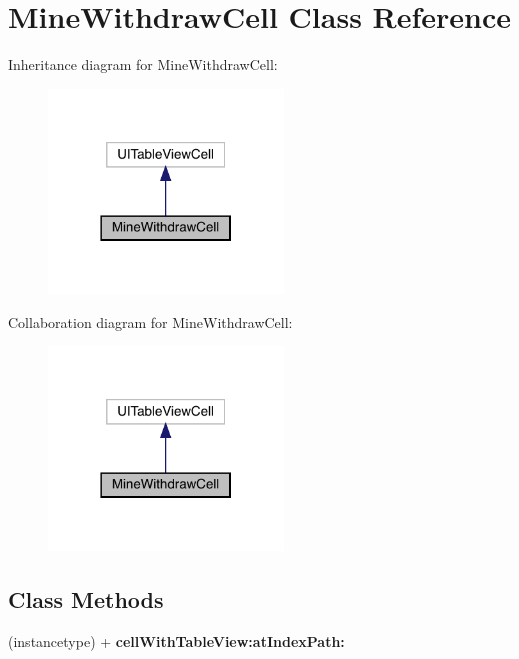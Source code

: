 \hypertarget{interface_mine_withdraw_cell}{}\section{Mine\+Withdraw\+Cell Class Reference}
\label{interface_mine_withdraw_cell}


Inheritance diagram for Mine\+Withdraw\+Cell\+:\nopagebreak
\begin{figure}[H]
\begin{center}
\leavevmode
\includegraphics[width=177pt]{interface_mine_withdraw_cell__inherit__graph}
\end{center}
\end{figure}


Collaboration diagram for Mine\+Withdraw\+Cell\+:\nopagebreak
\begin{figure}[H]
\begin{center}
\leavevmode
\includegraphics[width=177pt]{interface_mine_withdraw_cell__coll__graph}
\end{center}
\end{figure}
\subsection*{Class Methods}
\begin{DoxyCompactItemize}
\item 
\mbox{\label{interface_mine_withdraw_cell_a966aba1b88d34cd1c1cf33aff2ef5d52}} 
(instancetype) + {\bfseries cell\+With\+Table\+View\+:at\+Index\+Path\+:}
\end{DoxyCompactItemize}
